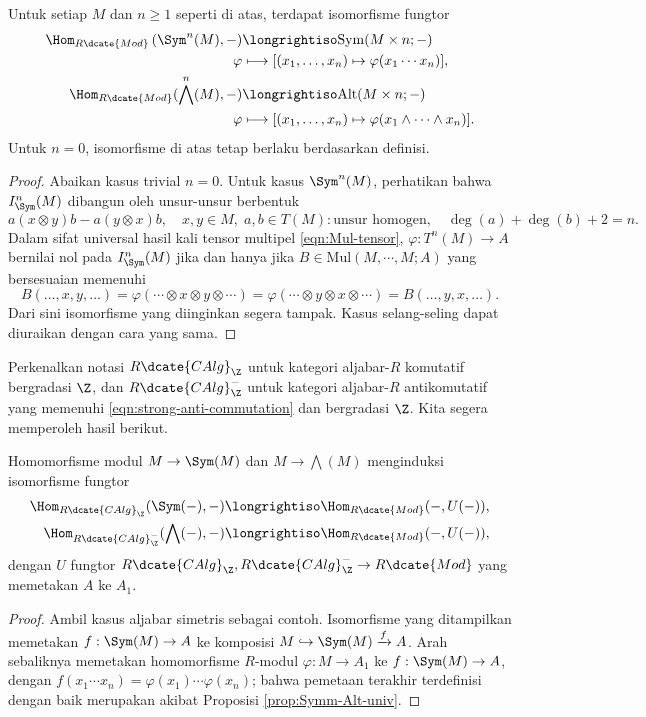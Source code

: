 \begin{proposition}\label{prop:Symm-Alt-univ}
	Untuk setiap $M$ dan $n \geq 1$ seperti di atas, terdapat isomorfisme fungtor
	\begin{align*}
		\Hom_{R\dcate{Mod}}\left( \Sym^n(M), - \right) & \longrightiso \mathrm{Sym}(M \times n; -) \\
		\varphi & \longmapsto [(x_1, \ldots, x_n) \mapsto \varphi(x_1 \cdots x_n)], \\
		\Hom_{R\dcate{Mod}}(\bigwedge^n(M), - ) & \longrightiso \mathrm{Alt}(M \times n; -) \\
		\varphi & \longmapsto [(x_1, \ldots, x_n) \mapsto \varphi(x_1 \wedge \cdots \wedge x_n)].
	\end{align*}
	Untuk $n=0$, isomorfisme di atas tetap berlaku berdasarkan definisi.
\end{proposition}
\begin{proof}
	Abaikan kasus trivial $n=0$. Untuk kasus $\Sym^n(M)$, perhatikan bahwa $I^n_{\Sym}(M)$ dibangun oleh unsur-unsur berbentuk
	\[ a(x \otimes y )b- a(y \otimes x)b, \quad x,y \in M, \; a,b \in T(M): \text{unsur homogen}, \quad \deg(a)+\deg(b)+2=n. \]
	Dalam sifat universal hasil kali tensor multipel \eqref{eqn:Mul-tensor}, $\varphi: T^n(M) \to A$ bernilai nol pada $I^n_{\Sym}(M)$ jika dan hanya jika $B \in \text{Mul}(M, \cdots, M; A)$ yang bersesuaian memenuhi
	\[ B(\ldots, x, y, \ldots) = \varphi(\cdots \otimes x \otimes y \otimes \cdots) = \varphi(\cdots \otimes y \otimes x \otimes \cdots) = B(\ldots, y, x, \ldots). \]
	Dari sini isomorfisme yang diinginkan segera tampak. Kasus selang-seling dapat diuraikan dengan cara yang sama.
\end{proof}

Perkenalkan notasi $R\dcate{CAlg}_\Z$ untuk kategori aljabar-$R$ komutatif bergradasi $\Z$, dan $R\dcate{CAlg}^-_\Z$ untuk kategori aljabar-$R$ antikomutatif yang memenuhi \eqref{eqn:strong-anti-commutation} dan bergradasi $\Z$. Kita segera memperoleh hasil berikut.
\begin{theorem}\label{prop:Sym-wedge-universal}
	Homomorfisme modul $M \to \Sym(M)$ dan $M \to \bigwedge(M)$ menginduksi isomorfisme fungtor
	\begin{align*}
		\Hom_{R\dcate{CAlg}_\Z}(\Sym(-),-) & \longrightiso \Hom_{R\dcate{Mod}}(-, U(-)), \\
		\Hom_{R\dcate{CAlg}^-_\Z}(\bigwedge(-),-) & \longrightiso \Hom_{R\dcate{Mod}}(-, U(-)),
	\end{align*}
	dengan $U$ fungtor $R\dcate{CAlg}_\Z, R\dcate{CAlg}^-_\Z \to R\dcate{Mod}$ yang memetakan $A$ ke $A_1$.
\end{theorem}
\begin{proof}
	Ambil kasus aljabar simetris sebagai contoh. Isomorfisme yang ditampilkan memetakan $f: \Sym(M) \to A$ ke komposisi $M \hookrightarrow \Sym(M) \xrightarrow{f} A$. Arah sebaliknya memetakan homomorfisme $R$-modul $\varphi: M \to A_1$ ke $f: \Sym(M) \to A$, dengan $f(x_1 \cdots x_n) = \varphi(x_1) \cdots \varphi(x_n)$; bahwa pemetaan terakhir terdefinisi dengan baik merupakan akibat Proposisi \ref{prop:Symm-Alt-univ}.
\end{proof}

